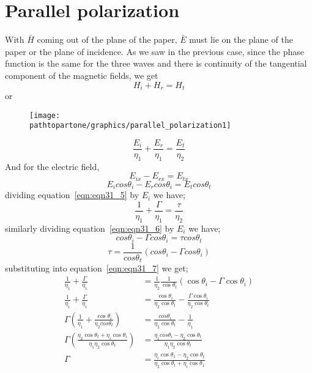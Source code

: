 \section{Parallel polarization}
With $\bar{H}$ coming out of the plane of the paper, $\bar{E}$ must lie on the plane of the paper or the plane of incidence. As we saw in the previous case, since the phase function is the same for the three waves and there is continuity of the tangential component of the magnetic fields, we get
\begin{equation*}
H_{i} + H_{r} = H_{t}
\end{equation*}
or
\begin{figure}[h]
\centering
\texttt{[image: \\pathtopartone/graphics/parallel\_polarization1]}
\caption{}
\label{fig:15}
\end{figure}
\begin{equation}
\frac{E_{i}}{\eta_{1}} + \frac{E_{r}}{\eta_{1}} = \frac{E_{t}}{\eta_{2}}
\label{eqn:eqn31_5}
\end{equation}
And for the electric field,
\begin{equation*}
E_{ix} - E_{rx} = E_{tx}
\end{equation*}
\begin{equation}
E_{i} cos\theta_{i} - E_{r} cos\theta_{i} = E_{t} cos\theta_{t}
\label{eqn:eqn31_6}
\end{equation}
dividing equation~\ref{eqn:eqn31_5} by $E_{i}$ we have;
\begin{equation}
\frac{1}{\eta_{1}} + \frac{\Gamma}{\eta_{1}} = \frac{\tau}{\eta_{2}}
\label{eqn:eqn31_7}
\end{equation}
similarly dividing  equation~\ref{eqn:eqn31_6} by $E_{i}$ we have;
\begin{equation}
cos\theta_{i} - \Gamma cos\theta_{i} = \tau cos\theta_{t}
\end{equation}
\begin{equation*}
\tau = \frac{1}{cos\theta_{t}} (cos\theta_{i} - \Gamma cos\theta_{i})
\end{equation*}
substituting into equation~\ref{eqn:eqn31_7} we get;
\begin{align*}
\frac{1}{\eta_{1}} + \frac{\Gamma}{\eta_{1}} &= \frac{1}{\eta_{2}} \frac{1}{\cos\theta_{t}} (\cos\theta_{i} - \Gamma \cos\theta_{i})\\
\frac{1}{\eta_{1}} + \frac{\Gamma}{\eta_{1}} &= \frac{\cos \theta_{i}}{\eta_{2}\cos \theta_{t}} - \frac{\Gamma \cos\theta_{i}}{\eta_{2} \cos\theta_{t}}\\
\Gamma \left(\frac{1}{\eta_{1}} + \frac{\cos\theta_{i}}{\eta_{2} cos\theta_{t}}\right) &= \frac{cos\theta_{i}}{\eta_{2} \cos\theta_{t}} - \frac{1}{\eta_{1}}\\
\Gamma \left(\frac{\eta_{2} \cos\theta_{t} + \eta_{i} \cos\theta_{i}}{\eta_{1} \eta_{2} \cos\theta_{t}}\right) &= \frac{\eta_{1} cos\theta_{i} - \eta_{2} \cos\theta_{t}}{\eta_{1} \eta_{2} \cos\theta_{t}}\\
\Gamma &= \frac{\eta_{i} \cos\theta_{1} - \eta_{2} \cos\theta_{t}}{\eta_{2} \cos\theta_{t} + \eta_{i} \cos\theta_{1}}
\end{align*}

